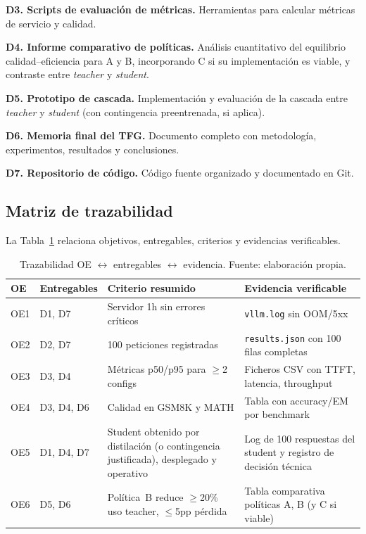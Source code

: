 \textbf{D3. Scripts de evaluación de métricas.} Herramientas para calcular métricas de servicio y calidad.

\textbf{D4. Informe comparativo de políticas.} Análisis cuantitativo del equilibrio calidad--eficiencia para A y B, incorporando C si su implementación es viable, y contraste entre \textit{teacher} y \textit{student}.

\textbf{D5. Prototipo de cascada.} Implementación y evaluación de la cascada entre \textit{teacher} y \textit{student} (con contingencia preentrenada, si aplica).

\textbf{D6. Memoria final del TFG.} Documento completo con metodología, experimentos, resultados y conclusiones.

\textbf{D7. Repositorio de código.} Código fuente organizado y documentado en Git.

\subsection{Matriz de trazabilidad}

La Tabla~\ref{tab:trace} relaciona objetivos, entregables, criterios y evidencias verificables.

\begin{table}[H]
\centering
\caption{Trazabilidad OE $\leftrightarrow$ entregables $\leftrightarrow$ evidencia. Fuente: elaboración propia.}
\label{tab:trace}
\footnotesize
\setlength{\tabcolsep}{3pt}
\begin{tabularx}{\textwidth}{>{\raggedright\arraybackslash}p{0.8cm} >{\raggedright\arraybackslash}p{1.8cm} X >{\raggedright\arraybackslash}p{3.8cm}}
\toprule
\textbf{OE} & \textbf{Entregables} & \textbf{Criterio resumido} & \textbf{Evidencia verificable} \\
\midrule
OE1 & D1, D7 & Servidor 1h sin errores críticos & \texttt{vllm.log} sin OOM/5xx \\
OE2 & D2, D7 & 100 peticiones registradas & \texttt{results.json} con 100 filas completas \\
OE3 & D3, D4 & Métricas p50/p95 para $\geq$2 configs & Ficheros CSV con TTFT, latencia, throughput \\
OE4 & D3, D4, D6 & Calidad en GSM8K y MATH & Tabla con accuracy/EM por benchmark \\
OE5 & D1, D4, D7 & Student obtenido por distilación (o contingencia justificada), desplegado y operativo & Log de 100 respuestas del student y registro de decisión técnica \\
OE6 & D5, D6 & Política~B reduce $\geq$20\% uso teacher, $\leq$5pp pérdida & Tabla comparativa políticas A, B (y C si viable) \\
\bottomrule
\end{tabularx}
\end{table}

